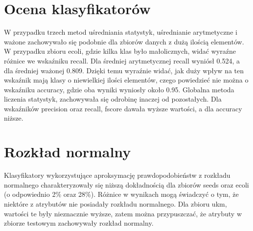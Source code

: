 \section{Ocena klasyfikatorów}
W przypadku trzech metod uśredniania statystyk, uśrednianie arytmetyczne i ważone zachowywało się podobnie dla zbiorów danych z dużą ilością elementów. W przypadku zbioru ecoli, gdzie kilka klas było małolicznych, widać wyraźne różnice we wskaźniku recall. Dla średniej arytmetycznej recall wyniósł 0.524, a dla średniej ważonej 0.809. Dzięki temu wyraźnie widać, jak duży wpływ na ten wskaźnik mają klasy o niewielkiej ilości elementów, czego powiedzieć nie można o wskaźniku accuracy, gdzie oba wyniki wyniosły około 0.95. Globalna metoda liczenia statystyk, zachowywała się odrobinę inaczej od pozostałych. Dla wskaźników precision oraz recall, fscore dawała wyższe wartości, a dla accuracy niższe.

\section{Rozkład normalny}
Klasyfikatory wykorzystujące aproksymację prawdopodobieństw z rozkładu normalnego charakteryzowały się niższą dokładnością dla zbiorów seeds oraz ecoli (o odpowiednio 2\% oraz 28\%). Różnice w wynikach mogą świadczyć o tym, że niektóre z atrybutów nie posiadały rozkładu normalnego. Dla zbioru ukm, wartości te były nieznacznie wyższe, zatem można przypuszczać, że atrybuty w zbiorze testowym zachowywały rozkład normalny.